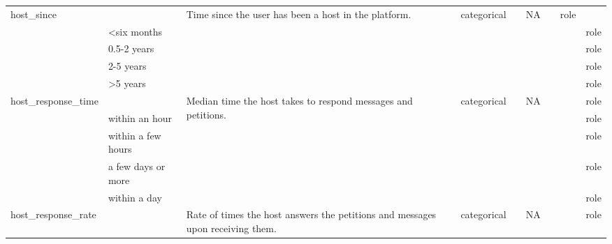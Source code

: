 \begin{center}
\begin{longtable}{@{}lllllllll@{}}
host\_since &                             & \multirow{5}{15ex}{Time since the user has been a host in the platform.} & categorical &                & NA                          &         & role \\
                            & \textless{}six months          &                                   &             &                &                             &                     &         & role \\
                            & 0.5-2 years                  &                                   &             &                &                             &                     &         & role \\
                            & 2-5 years                    &                                   &             &                &                             &                     &         & role \\
                            & \textgreater{}5 years        &                                   &             &                &                             &                     &         & role \\
host\_response\_time        &                             & \multirow{5}{15ex}{Median time the host takes to respond messages and petitions.} & categorical &                & NA                          &                     &         & role \\
                            & within an hour              &                                   &             &                &                             &                     &         & role \\
                            & within a few hours          &                                   &             &                &                             &                     &         & role \\
                            & a few days or more          &                                   &             &                &                             &                     &         & role \\
                            & within a day                &                                   &             &                &                             &                     &         & role \\
host\_response\_rate        &                             & \multirow{5}{15ex}{Rate of times the host answers the petitions and messages upon receiving them.} & categorical &                & NA                    &                     &         & role \\

\end{longtable}
\end{center}
